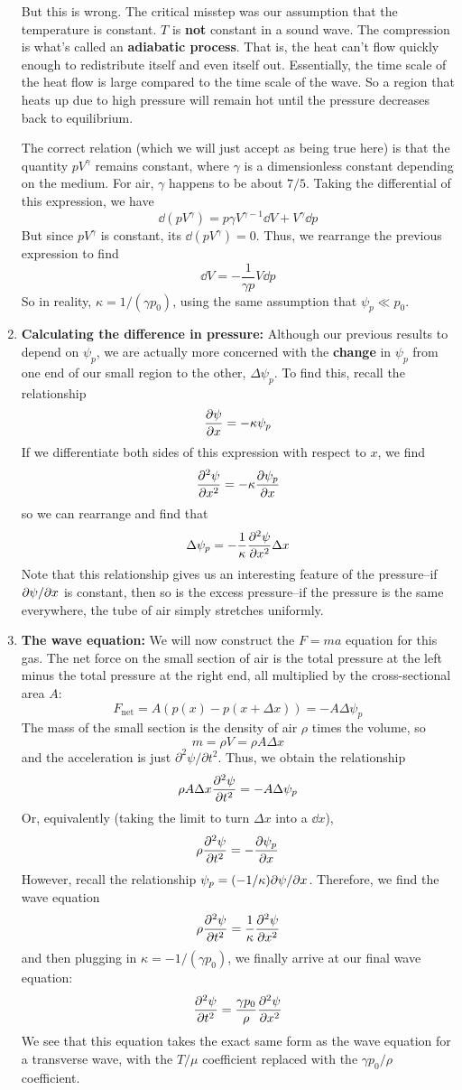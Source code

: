 \begin{enumerate}
    But this is wrong. The critical misstep was our assumption that the temperature is constant. $T$ is \textbf{not} constant in a sound wave. The compression is what's called an \textbf{adiabatic process}. That is, the heat can't flow quickly enough to redistribute itself and even itself out. Essentially, the time scale of the heat flow is large compared to the time scale of the wave. So a region that heats up due to high pressure will remain hot until the pressure decreases back to equilibrium. 

    The correct relation (which we will just accept as being true here) is that the quantity $pV^\gamma$ remains constant, where $\gamma$ is a dimensionless constant depending on the medium. For air, $\gamma$ happens to be about $7/5$. Taking the differential of this expression, we have
    \[ \dd (pV^\gamma) = p\gamma V^{\gamma -1}\dd V + V^\gamma \dd p\]
    But since $pV^\gamma$ is constant, its $\dd (pV^\gamma) = 0$. Thus, we rearrange the previous expression to find
    \[ \dd V = -\frac{1}{\gamma p}V\dd p\]
    So in reality, $\kappa = 1/(\gamma p_0)$, using the same assumption that $\psi_p \ll p_0$.
    \item \textbf{Calculating the difference in pressure:} Although our previous results to depend on $\psi_p$, we are actually more concerned with the \textbf{change} in $\psi_p$ from one end of our small region to the other, $\Delta \psi_p$. To find this, recall the relationship
    \[ \pdv{\psi}{x} = -\kappa \psi_p\]
    If we differentiate both sides of this expression with respect to $x$, we find
    \[ \pdv[2]{\psi}{x} = - \kappa \pdv{\psi_p}{x} \]
    so we can rearrange and find that
    \[ \Delta \psi_p = -\frac{1}{\kappa}\pdv[2]{\psi}{x}\Delta x\]
    Note that this relationship gives us an interesting feature of the pressure--if $\partial \psi/\partial x$ is constant, then so is the excess pressure--if the pressure is the same everywhere, the tube of air simply stretches uniformly.
    \item \textbf{The wave equation:} We will now construct the $F=ma$ equation for this gas. The net force on the small section of air is the total pressure at the left minus the total pressure at the right end, all multiplied by the cross-sectional area $A$:
    \[ F_\text{net} = A(p(x) - p(x + \Delta x)) = -A\Delta \psi_p\]
    The mass of the small section is the density of air $\rho$ times the volume, so
    \[ m = \rho V = \rho A \Delta x\]
    and the acceleration is just $\partial^2 \psi/\partial t^2$. Thus, we obtain the relationship
    \[ \rho A\Delta x \pdv[2]{\psi}{t} = -A\Delta\psi_p \]
    Or, equivalently (taking the limit to turn $\Delta x$ into a $\dd x$),
    \[ \rho \pdv[2]{\psi}{t} = -\pdv{\psi_p}{x} \]
    However, recall the relationship $\psi_p = (-1/\kappa)\partial \psi/\partial x$. Therefore, we find the wave equation
    \[ \rho\pdv[2]{\psi}{t} = \frac{1}{\kappa} \pdv[2]{\psi}{x}\]
    and then plugging in $\kappa = -1/(\gamma p_0)$, we finally arrive at our final wave equation:
    \[ \pdv[2]{\psi}{t} = \frac{\gamma p_0}{\rho} \pdv[2]{\psi}{x} \]
    We see that this equation takes the exact same form as the wave equation for a transverse wave, with the $T/\mu$ coefficient replaced with the $\gamma p_0/\rho$ coefficient.
\end{enumerate}
